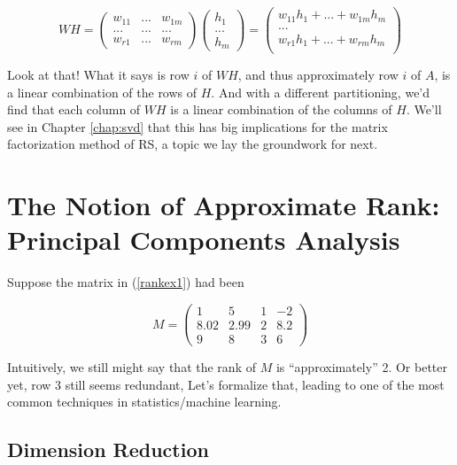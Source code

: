 \begin{equation}
WH =
\left (
\begin{array}{ccc}
w_{11} & ... & w_{1m}\\
... & ... & ... \\
w_{r1} & ... & w_{rm}
\end{array}
\right )
\left (
\begin{array}{cc}
h_1 \\
... \\
h_m 
\end{array}
\right )
=
\left (
\begin{array}{cc}
w_{11}h_1 + ... + w_{1m} h_m \\
... \\
w_{r1}h_1 + ... + w_{rm} h_m \\
\end{array}
\right )
\end{equation}

Look at that!  What it says is row $i$ of $WH$, and thus approximately
row $i$ of $A$, is a linear combination of the rows of $H$.  And with a
different partitioning, we'd find that each column of $WH$ is a linear
combination of the columns of $H$.  We'll see in Chapter \ref{chap:svd}
that this has big implications for the matrix factorization method of
RS, a topic we lay the groundwork for next.

\section{The Notion of Approximate Rank:  Principal Components
Analysis}

Suppose the matrix in (\ref{rankex1}) had been

\begin{equation}
\label{rankex2}
M =
\left (
\begin{array}{rrrr}
1 & 5 & 1 & -2\\
8.02 & 2.99 & 2 & 8.2\\
9 & 8 & 3 & 6 
\end{array}
\right )
\end{equation}

Intuitively, we still might say that the rank of $M$ is ``approximately'' 2.
Or better yet, row 3 still seems redundant, Let's formalize that,
leading to one of the most common techniques in statistics/machine
learning.

\subsection{Dimension Reduction}

